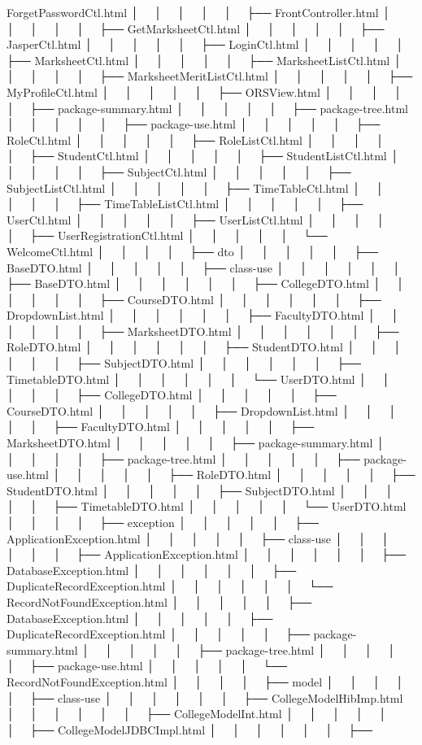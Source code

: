 Forget\+Password\+Ctl.\+html │   │   │   │   │   ├── Front\+Controller.\+html │   │   │   │   │   ├── Get\+Marksheet\+Ctl.\+html │   │   │   │   │   ├── Jasper\+Ctl.\+html │   │   │   │   │   ├── Login\+Ctl.\+html │   │   │   │   │   ├── Marksheet\+Ctl.\+html │   │   │   │   │   ├── Marksheet\+List\+Ctl.\+html │   │   │   │   │   ├── Marksheet\+Merit\+List\+Ctl.\+html │   │   │   │   │   ├── My\+Profile\+Ctl.\+html │   │   │   │   │   ├── ORSView.\+html │   │   │   │   │   ├── package-\/summary.\+html │   │   │   │   │   ├── package-\/tree.\+html │   │   │   │   │   ├── package-\/use.\+html │   │   │   │   │   ├── Role\+Ctl.\+html │   │   │   │   │   ├── Role\+List\+Ctl.\+html │   │   │   │   │   ├── Student\+Ctl.\+html │   │   │   │   │   ├── Student\+List\+Ctl.\+html │   │   │   │   │   ├── Subject\+Ctl.\+html │   │   │   │   │   ├── Subject\+List\+Ctl.\+html │   │   │   │   │   ├── Time\+Table\+Ctl.\+html │   │   │   │   │   ├── Time\+Table\+List\+Ctl.\+html │   │   │   │   │   ├── User\+Ctl.\+html │   │   │   │   │   ├── User\+List\+Ctl.\+html │   │   │   │   │   ├── User\+Registration\+Ctl.\+html │   │   │   │   │   └── Welcome\+Ctl.\+html │   │   │   │   ├── dto │   │   │   │   │   ├── Base\+DTO.\+html │   │   │   │   │   ├── class-\/use │   │   │   │   │   │   ├── Base\+DTO.\+html │   │   │   │   │   │   ├── College\+DTO.\+html │   │   │   │   │   │   ├── Course\+DTO.\+html │   │   │   │   │   │   ├── Dropdown\+List.\+html │   │   │   │   │   │   ├── Faculty\+DTO.\+html │   │   │   │   │   │   ├── Marksheet\+DTO.\+html │   │   │   │   │   │   ├── Role\+DTO.\+html │   │   │   │   │   │   ├── Student\+DTO.\+html │   │   │   │   │   │   ├── Subject\+DTO.\+html │   │   │   │   │   │   ├── Timetable\+DTO.\+html │   │   │   │   │   │   └── User\+DTO.\+html │   │   │   │   │   ├── College\+DTO.\+html │   │   │   │   │   ├── Course\+DTO.\+html │   │   │   │   │   ├── Dropdown\+List.\+html │   │   │   │   │   ├── Faculty\+DTO.\+html │   │   │   │   │   ├── Marksheet\+DTO.\+html │   │   │   │   │   ├── package-\/summary.\+html │   │   │   │   │   ├── package-\/tree.\+html │   │   │   │   │   ├── package-\/use.\+html │   │   │   │   │   ├── Role\+DTO.\+html │   │   │   │   │   ├── Student\+DTO.\+html │   │   │   │   │   ├── Subject\+DTO.\+html │   │   │   │   │   ├── Timetable\+DTO.\+html │   │   │   │   │   └── User\+DTO.\+html │   │   │   │   ├── exception │   │   │   │   │   ├── Application\+Exception.\+html │   │   │   │   │   ├── class-\/use │   │   │   │   │   │   ├── Application\+Exception.\+html │   │   │   │   │   │   ├── Database\+Exception.\+html │   │   │   │   │   │   ├── Duplicate\+Record\+Exception.\+html │   │   │   │   │   │   └── Record\+Not\+Found\+Exception.\+html │   │   │   │   │   ├── Database\+Exception.\+html │   │   │   │   │   ├── Duplicate\+Record\+Exception.\+html │   │   │   │   │   ├── package-\/summary.\+html │   │   │   │   │   ├── package-\/tree.\+html │   │   │   │   │   ├── package-\/use.\+html │   │   │   │   │   └── Record\+Not\+Found\+Exception.\+html │   │   │   │   ├── model │   │   │   │   │   ├── class-\/use │   │   │   │   │   │   ├── College\+Model\+Hib\+Imp.\+html │   │   │   │   │   │   ├── College\+Model\+Int.\+html │   │   │   │   │   │   ├── College\+Model\+JDBCImpl.\+html │   │   │   │   │   │   ├── 